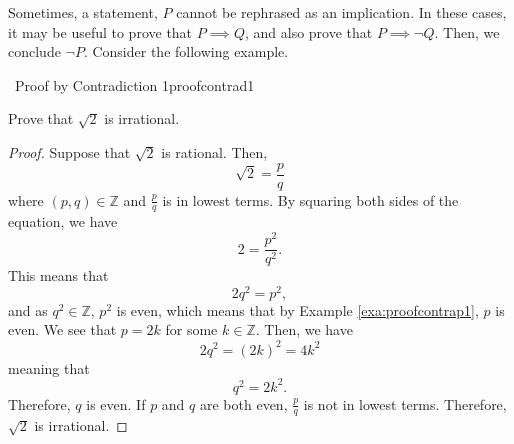     Sometimes, a statement, \(P\) cannot be rephrased as an implication. In these cases, it may be useful to prove that \(P\implies Q\), and also prove that \(P\implies \neg Q\). Then, we conclude \(\neg P\). Consider the following example.
    \begin{example}{\Difficulty\,\Difficulty\,\,Proof by Contradiction 1}{proofcontrad1}
    
        Prove that \(\sqrt{2}\) is irrational.
        
        \begin{proof}
            Suppose that \(\sqrt{2}\) is rational. Then,
            \begin{equation*}
                \sqrt{2}=\frac{p}{q}
            \end{equation*}
            where \((p,q)\in\mathbb{Z}\) and \(\frac{p}{q}\) is in lowest terms. By squaring both sides of the equation, we have
            \begin{equation*}
                2=\frac{p^2}{q^2}.
            \end{equation*}
            This means that
            \begin{equation*}
                2q^2=p^2,
            \end{equation*}
            and as \(q^2\in\mathbb{Z}\), \(p^2\) is even, which means that by Example \ref{exa:proofcontrap1}, \(p\) is even. We see that \(p=2k\) for some \(k\in\mathbb{Z}\). Then, we have
            \begin{equation*}
                2q^2=(2k)^2=4k^2
            \end{equation*}
            meaning that
            \begin{equation*}
                q^2=2k^2.
            \end{equation*}
            Therefore, \(q\) is even. If \(p\) and \(q\) are both even, \(\frac{p}{q}\) is not in lowest terms. Therefore, \(\sqrt{2}\) is irrational.
        \end{proof}
    
    \end{example}